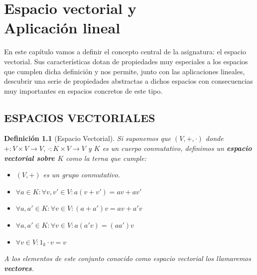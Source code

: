 \documentclass[10pt,a4paper,openright]{book}
\theoremstyle{break}
\newtheorem*{defi}{Definición}
\begin{document}
\chapter{Espacio vectorial y \\ Aplicación lineal}
En este capítulo vamos a definir el concepto central de la asignatura: el espacio vectorial. Sus características dotan de propiedades muy especiales a los espacios que cumplen dicha definición y nos permite, junto con las aplicaciones lineales, descubrir una serie de propiedades abstractas a dichos espacios con consecuencias muy importantes en espacios concretos de este tipo.

\section{ESPACIOS VECTORIALES}
\begin{defi}[Espacio Vectorial]
Si suponemos que $(V,+,\cdot)$ donde $+: V\times V\rightarrow V$, $\cdot : K\times V\rightarrow V$ y $K$ es un cuerpo conmutativo, definimos un \textbf{espacio vectorial sobre $K$} como la terna que cumple:
\begin{itemize}
\item $(V,+)$ es un grupo conmutativo.

\item $\forall a \in K: \forall v,v'\in V: a(v+v')=av+av'$

\item $\forall a,a' \in K: \forall v\in V: (a+a')v=av+a'v$

\item $\forall a,a'\in K: \forall v \in V: a(a'v)=(aa')v$

\item $\forall v\in V: 1_k\cdot v=v$
\end{itemize}
A los elementos de este conjunto conocido como espacio vectorial los llamaremos \textbf{vectores}.
\end{defi}
\end{document}
